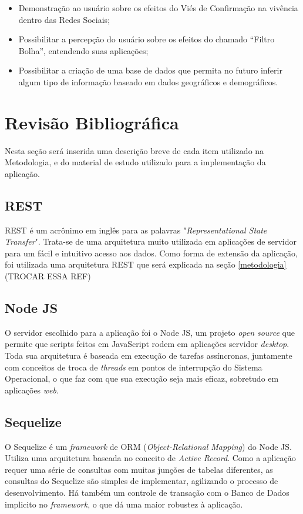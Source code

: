 \documentclass[
	12pt,				%
	oneside,			%
	a4paper,			%
	english,			%
	brazil				%
	]{abntex2ppgsi}
\begin{document}
\begin{itemize}
	\item{Demonstração ao usuário sobre os efeitos do Viés de Confirmação na vivência dentro das Redes Sociais;} 
	\item{Possibilitar a percepção do usuário sobre os efeitos do chamado “Filtro Bolha”, entendendo suas aplicações;}
	\item{Possibilitar a criação de uma base de dados que permita no futuro inferir algum tipo de informação baseado em dados geográficos e demográficos.}
\end{itemize}


\chapter{Revisão Bibliográfica}

Nesta seção será inserida uma descrição breve de cada item utilizado na Metodologia, e do material de estudo utilizado para a implementação da aplicação.

\section{REST}
REST é um acrônimo em inglês para as palavras "\textit{Representational State Transfer}". Trata-se de uma arquitetura muito utilizada em aplicações de servidor para um fácil e intuitivo acesso aos dados. Como forma de extensão da aplicação, foi utilizada uma arquitetura REST que será explicada na seção \ref{metodologia} (TROCAR ESSA REF)

\section{Node JS}
O servidor escolhido para a aplicação foi o Node JS, um projeto \textit{open source} que permite que scripts feitos em JavaScript rodem em aplicações servidor \textit{desktop}. Toda sua arquitetura é baseada em execução de tarefas assíncronas, juntamente com conceitos de troca de \textit{threads} em pontos de interrupção do Sistema Operacional, o que faz com que sua execução seja mais eficaz, sobretudo em aplicações \textit{web}.

\section{Sequelize}
O Sequelize é um \textit{framework} de ORM (\textit{Object-Relational Mapping}) do Node JS. Utiliza uma arquitetura baseada no conceito de \textit{Active Record}. Como a aplicação requer uma série de consultas com muitas junções de tabelas diferentes, as consultas do Sequelize são simples de implementar, agilizando o processo de desenvolvimento. Há também um controle de transação com o Banco de Dados implicito no \textit{framework}, o que dá uma maior robustez à aplicação. 
\end{document}
